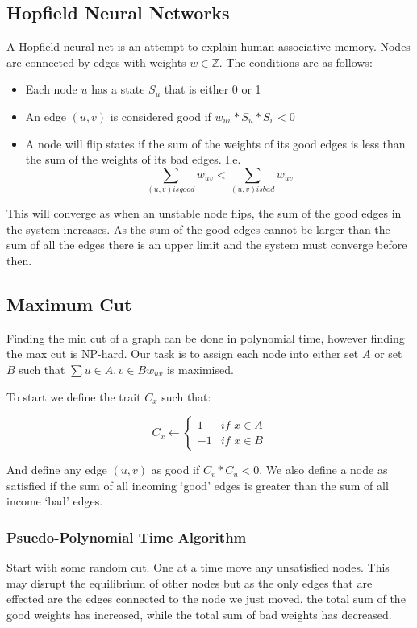 \documentclass[a4paper]{article}
\begin{document}
\subsection{Hopfield Neural Networks}
A Hopfield neural net is an attempt to explain human associative memory. Nodes are connected by edges with weights $w\in\mathbb{Z}$. The conditions are as follows:
\begin{itemize}
	\item Each node $u$ has a state $S_u$ that is either 0 or 1
	\item An edge $(u,v)$ is considered good if $w_{uv} * S_u * S_v < 0$
	\item A node will flip states if the sum of the weights of its good edges is less than the sum of the weights of its bad edges. I.e.
	$$\sum\limits_{(u,v) is good} w_{uv} < \sum\limits_{(u,v) is bad} w_{uv}$$
\end{itemize}
This will converge as when an unstable node flips, the sum of the good edges in the system increases. As the sum of the good edges cannot be larger than the sum of all the edges there is an upper limit and the system must converge before then.

\subsection{Maximum Cut}
Finding the min cut of a graph can be done in polynomial time, however finding the max cut is NP-hard. Our task is to assign each node into either set $A$ or set $B$ such that $\sum\limits{u\in A, v\in B} w_{uv}$ is maximised.

To start we define the trait $C_x$ such that:

$$C_x \gets \begin{cases}1 &\textit{if } x\in A \\ -1 &\textit{if } x\in B\end{cases}$$

And define any edge $(u, v)$ as good if $C_v*C_u < 0$. We also define a node as satisfied if the sum of all incoming `good' edges is greater than the sum of all income `bad' edges.

\subsubsection{Psuedo-Polynomial Time Algorithm}
Start with some random cut. One at a time move any unsatisfied nodes. This may disrupt the equilibrium of other nodes but as the only edges that are effected are the edges connected to the node we just moved, the total sum of the good weights has increased, while the total sum of bad weights has decreased.
\end{document}
